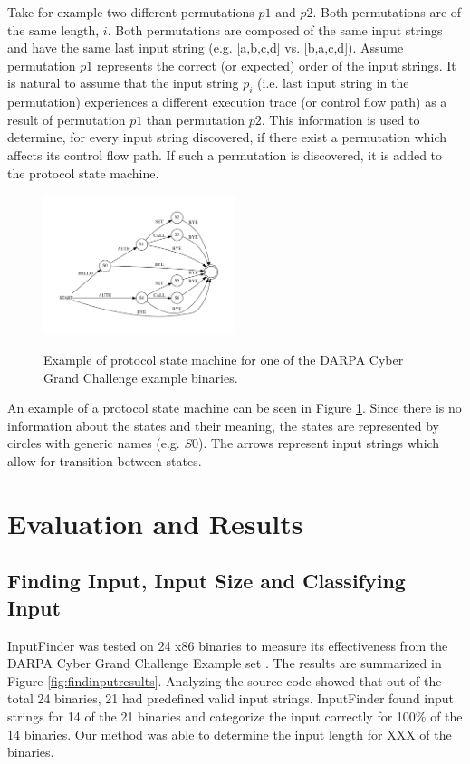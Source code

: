 \documentclass{acm_proc_article-sp}
\def \tool {InputFinder}
\def \numbinaries {24}
\begin{document}
Take for example two different permutations $p1$ and $p2$.
Both permutations are of the same length, $i$.
Both permutations are composed of the same input strings and have the same last input string (e.g. [a,b,c,d] vs. [b,a,c,d]).
Assume permutation $p1$ represents the correct (or expected) order of the input strings.
It is natural to assume that the input string $p_i$ (i.e. last input string in the permutation) experiences a different execution trace (or control flow path) as a result of permutation $p1$ than permutation $p2$.
This information is used to determine, for every input string discovered, if there exist a permutation which affects its control flow path.
If such a permutation is discovered, it is added to the protocol state machine.

\begin{figure}[h!]
\caption{Example of protocol state machine for one of the DARPA Cyber Grand Challenge example binaries.}
\centering
\includegraphics[width=0.5\textwidth]{protocoldiagram}
\label{fig:psm_example}
\end{figure}

An example of a protocol state machine can be seen in Figure \ref{fig:psm_example}.
Since there is no information about the states and their meaning, the states are represented by circles with generic names (e.g. $S0$).
The arrows represent input strings which allow for transition between states.

\section{Evaluation and Results} \label{results}
\subsection{Finding Input, Input Size and Classifying Input}
\tool{} was tested on \numbinaries{} x86 binaries to measure its effectiveness from the DARPA Cyber Grand Challenge Example set \cite{darpacgc}.
The results are summarized in Figure \ref{fig:findinputresults}.
Analyzing the source code showed that out of the total \numbinaries{} binaries, 21 had predefined valid input strings.
\tool{} found input strings for 14 of the 21 binaries and categorize the input correctly for 100\% of the 14 binaries.
Our method was able to determine the input length for XXX of the binaries.
\end{document}
